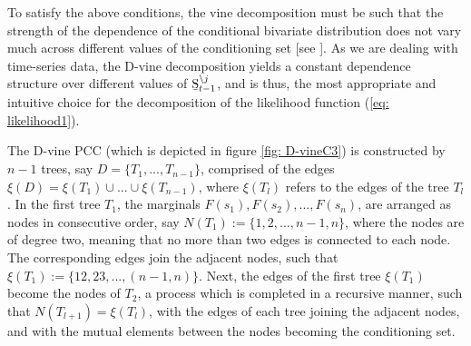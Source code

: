 \documentclass[harvard,11pt]{article}
\begin{document}
To satisfy the above conditions, the vine decomposition must be such that the strength of the dependence of the conditional bivariate distribution does not vary much across different values of the conditioning set [see \citet{panagiotelis2012pair}]. As we are dealing with time-series data, the D-vine decomposition yields a constant dependence structure over different values of $\text{\b{S}}_{t-1}^{\backslash j}$, and is thus, the most appropriate and intuitive choice for the decomposition of the likelihood function (\ref{eq: likelihood1}). 

The D-vine PCC (which is depicted in figure \ref{fig: D-vineC3}) is constructed by $n-1$ trees, say $D=\{T_1,...,T_{n-1}\}$, comprised of the edges $\xi(D)=\xi(T_1)\cup...\cup \xi(T_{n-1})$, where $\xi(T_l)$ refers to the edges of the tree $T_l$. In the first tree $T_1$, the marginals $F(s_1),F(s_2),...,F(s_n)$, are arranged as nodes in consecutive order, say $N(T_1):=\{1,2,...,n-1,n\}$, where the nodes are of degree two, meaning that no more than two edges is connected to each node. The corresponding edges join the adjacent nodes, such that $\xi(T_1):=\{12,23,...,(n-1,n)\}$. Next, the edges of the first tree $\xi(T_1)$ become the nodes of $T_2$, a process which is completed in a recursive manner, such that $N(T_{l+1})=\xi(T_l)$, with the edges of each tree joining the adjacent nodes, and with the mutual elements between the nodes becoming the conditioning set.  
\end{document}
